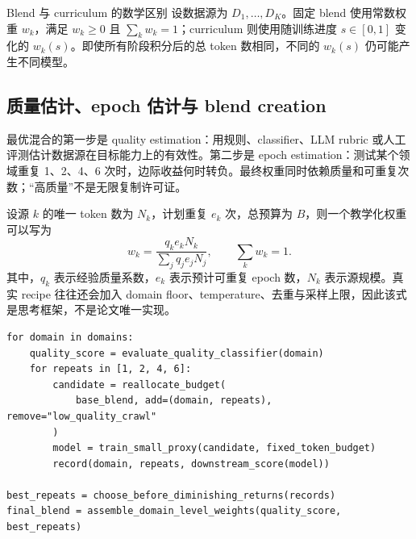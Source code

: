 
\begin{importantbox}{Blend 与 curriculum 的数学区别}
设数据源为 $D_1,\ldots,D_K$。固定 blend 使用常数权重 $w_k$，满足 $w_k\ge 0$ 且 $\sum_k w_k=1$；curriculum 则使用随训练进度 $s\in[0,1]$ 变化的 $w_k(s)$。即使所有阶段积分后的总 token 数相同，不同的 $w_k(s)$ 仍可能产生不同模型。
\end{importantbox}

\subsection{质量估计、epoch 估计与 blend creation}

最优混合的第一步是 quality estimation：用规则、classifier、LLM rubric 或人工评测估计数据源在目标能力上的有效性。第二步是 epoch estimation：测试某个领域重复 1、2、4、6 次时，边际收益何时转负。最终权重同时依赖质量和可重复次数；“高质量”不是无限复制许可证。


设源 $k$ 的唯一 token 数为 $N_k$，计划重复 $e_k$ 次，总预算为 $B$，则一个教学化权重可以写为
\[
w_k=\frac{q_k e_k N_k}{\sum_j q_j e_j N_j},
\qquad
\sum_k w_k=1.
\]
其中，$q_k$ 表示经验质量系数，$e_k$ 表示预计可重复 epoch 数，$N_k$ 表示源规模。真实 recipe 往往还会加入 domain floor、temperature、去重与采样上限，因此该式是思考框架，不是论文唯一实现。

\begin{lstlisting}[caption={领域级质量与重复次数消融的教学版伪代码}]
for domain in domains:
    quality_score = evaluate_quality_classifier(domain)
    for repeats in [1, 2, 4, 6]:
        candidate = reallocate_budget(
            base_blend, add=(domain, repeats), remove="low_quality_crawl"
        )
        model = train_small_proxy(candidate, fixed_token_budget)
        record(domain, repeats, downstream_score(model))

best_repeats = choose_before_diminishing_returns(records)
final_blend = assemble_domain_level_weights(quality_score, best_repeats)
\end{lstlisting}


